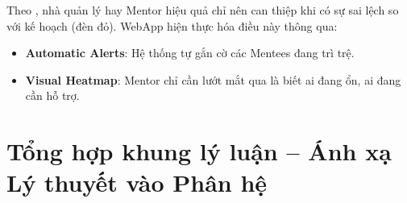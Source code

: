 Theo \citet{mbe1961}, nhà quản lý hay Mentor hiệu quả chỉ nên can thiệp khi có sự sai lệch so với kế hoạch (đèn đỏ). WebApp hiện thực hóa điều này thông qua:
\begin{itemize}
    \item \textbf{Automatic Alerts}: Hệ thống tự gắn cờ các Mentees đang trì trệ.
    \item \textbf{Visual Heatmap}: Mentor chỉ cần lướt mắt qua là biết ai đang ổn, ai đang cần hỗ trợ.
\end{itemize}

\section{Tổng hợp khung lý luận -- Ánh xạ Lý thuyết vào Phân hệ}

